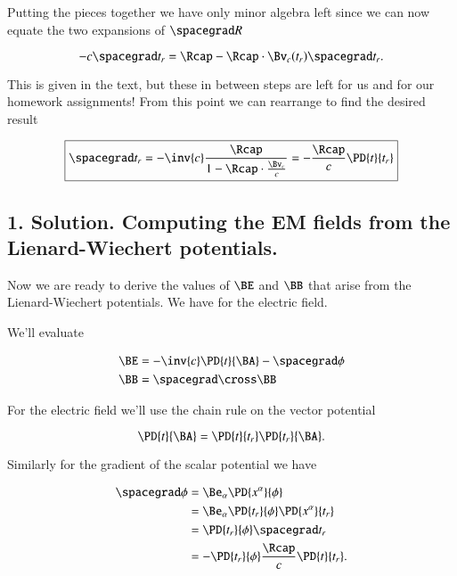 Putting the pieces together we have only minor algebra left since we can now equate the two expansions of $\spacegrad R$

\begin{equation}\label{eqn:relElectroDynProblemSet5:360}
- c \spacegrad t_r = \Rcap - \Rcap \cdot \Bv_c(t_r) \spacegrad t_r.
\end{equation}

This is given in the text, but these in between steps are left for us and for our homework assignments!  From this point we can rearrange to find the desired result

\begin{equation}\label{eqn:relElectroDynProblemSet5:380}
\boxed{
\spacegrad t_r = -\inv{c} \frac{\Rcap }{ 1 - \Rcap \cdot \frac{\Bv_c}{c} } = - \frac{\Rcap}{c} \PD{t}{t_r}
}
\end{equation}

\subsection{1. Solution.  Computing the EM fields from the Lienard-Wiechert potentials.}

Now we are ready to derive the values of $\BE$ and $\BB$ that arise from the Lienard-Wiechert potentials.  We have for the electric field.

We'll evaluate 

\begin{align*}
\BE &= -\inv{c} \PD{t}{\BA} - \spacegrad \phi \\
\BB &= \spacegrad \cross \BB
\end{align*}

For the electric field we'll use the chain rule on the vector potential

\begin{equation}\label{eqn:relElectroDynProblemSet5:400}
\PD{t}{\BA} = \PD{t}{t_r} \PD{t_r}{\BA}.
\end{equation}

Similarly for the gradient of the scalar potential we have

\begin{align*}
\spacegrad \phi 
&=
\Be_\alpha \PD{x^\alpha}{\phi} \\
&=
\Be_\alpha \PD{t_r}{\phi} \PD{x^\alpha}{t_r} \\
&=
\PD{t_r}{\phi} \spacegrad t_r \\
&=
- \PD{t_r}{\phi} \frac{\Rcap}{c} \PD{t}{t_r}.
\end{align*}


